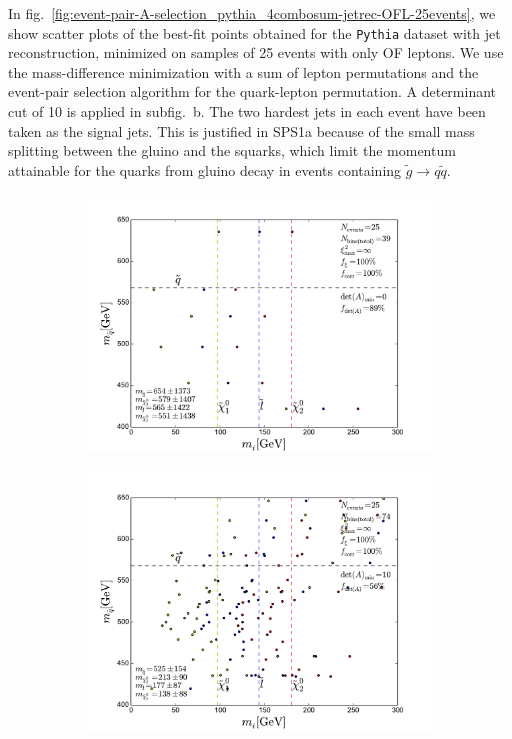 \documentclass[twoside,english]{uiofysmaster}
\begin{document}
In fig.\ \ref{fig:event-pair-A-selection_pythia_4combosum-jetrec-OFL-25events}, we show scatter plots of the best-fit points obtained for the {\tt Pythia} dataset with jet reconstruction, minimized on samples of 25 events with only OF leptons. We use the mass-difference minimization with a sum of lepton permutations and the event-pair selection algorithm for the quark-lepton permutation. A determinant cut of 10 is applied in subfig.\ b. The two hardest jets in each event have been taken as the signal jets. This is justified in SPS1a because of the small mass splitting between the gluino and the squarks, which limit the momentum attainable for the quarks from gluino decay in events containing $\tilde g \to q\tilde q$. 
\begin{figure}[hbt]
	\centering
	\begin{subfigure}[b]{0.45\textwidth}
		\includegraphics[width=\textwidth]{figures/improving_combinatorics/pythia_jetrec_onlyOFL_25evbins_nodetAcut-nosmear_TMP.pdf} 
		\caption{ }
		\label{fig:event-pair-A-selection_pythia_4combosum-jetrec-OFL-25events_a}
	\end{subfigure}
	\begin{subfigure}[b]{0.45\textwidth}
		\includegraphics[width=\textwidth]{figures/improving_combinatorics/pythia_jetrec_onlyOFL_25evbins_detAcut10-nosmear_TMP.pdf}

\end{subfigure}
\end{figure}
\end{document}
